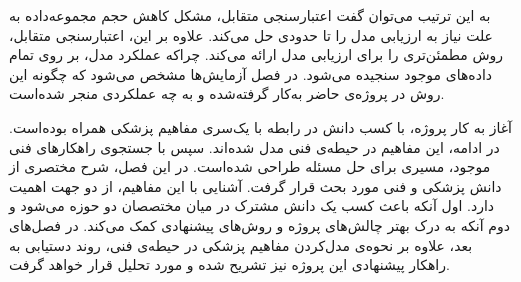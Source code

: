 به این ترتیب می‌توان گفت اعتبارسنجی متقابل، مشکل کاهش حجم مجموعه‌داده به علت نیاز به ارزیابی مدل را تا حدودی حل می‌کند.
علاوه بر این، اعتبارسنجی متقابل، روش مطمئن‌تری را برای ارزیابی مدل ارائه می‌کند.
چراکه عملکرد مدل، بر روی تمام داده‌های موجود سنجیده می‌شود.
در فصل آزمایش‌ها مشخص می‌شود که چگونه این روش در پروژه‌ی حاضر به‌کار گرفته‌شده و به چه عملکردی منجر شده‌است.


آغاز به کار پروژه، با کسب دانش در رابطه با یک‌سری مفاهیم 
پزشکی همراه بوده‌است.
در ادامه، این مفاهیم در حیطه‌ی فنی مدل شده‌اند.
سپس با جستجوی راهکار‌های فنی موجود، مسیری برای 
حل مسئله طراحی شده‌است.
در این فصل، شرح مختصری از دانش پزشکی و فنی مورد 
بحث قرار گرفت.
آشنایی با این مفاهیم، از دو جهت اهمیت دارد.
اول آنکه باعث کسب یک دانش مشترک در میان مختصصان دو حوزه می‌شود و دوم آنکه به درک بهتر چالش‌های پروژه و روش‌های پیشنهادی کمک می‌کند. 
در فصل‌های بعد، 
علاوه بر نحوه‌ی مدل‌کردن مفاهیم پزشکی در حیطه‌ی فنی، روند دستیابی به راهکار پیشنهادی این پروژه نیز
تشریح شده و مورد تحلیل قرار خواهد گرفت.
